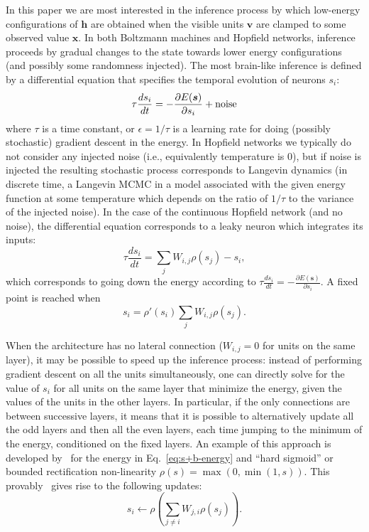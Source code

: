 \documentclass{article}
\newcommand   \vv{{\bm v}}
\newcommand   \vx{{\bm x}}
\newcommand   \vh{{\bm h}}
\newcommand   \vs{{\bm s}}
\begin{document}
In this paper we are most interested in the inference process by which low-energy
configurations of $\vh$ are obtained when the visible units $\vv$ are clamped
to some observed value $\vx$. In both Boltzmann machines and Hopfield networks,
inference proceeds by gradual changes to the state towards lower energy
configurations (and possibly some randomness injected). The most brain-like
inference is defined by a differential equation that specifies the temporal
evolution of neurons $s_i$:
\begin{equation}
  \label{eq:dsdt}
  \tau \frac{ds_i}{dt} = - \frac{\partial E(\vs)}{\partial s_i} + {\rm noise}
\end{equation}
where $\tau$ is a time constant, or $\epsilon=1/\tau$ is a learning rate for doing
(possibly stochastic) gradient descent in the energy. In Hopfield networks we
typically do not consider any injected noise (i.e., equivalently temperature is 0), but if noise is injected the resulting
stochastic process corresponds to Langevin dynamics (in discrete time, a Langevin
MCMC in a model associated with the given energy function at some temperature which
depends on the ratio of $1/\tau$ to the variance of the injected noise).
In the case of the continuous Hopfield network (and no noise), the differential equation corresponds
to a leaky neuron which integrates its inputs:
\begin{equation}
  \tau \frac{ds_i}{dt} = \sum_j W_{i,j} \rho(s_j) - s_i,
\end{equation}
which corresponds to going down the energy according to
$\tau \frac{ds_i}{dt} = - \frac{\partial E(\vs)}{\partial s_i}$. A fixed
point is reached when
\begin{equation}
   s_i = \rho'(s_i) \sum_j W_{i,j} \rho(s_j).
\end{equation}

When the architecture has no lateral connection ($W_{i,j}=0$ for units on the same layer),
it may be possible to speed up the inference process: instead of performing
gradient descent on all the units simultaneously, one can directly solve
for the value of $s_i$ for all units on the same layer that minimize the
energy, given the values of the units in the other layers. In particular,
if the only connections are between successive layers, it means that it is
possible to alternatively update all the odd layers and then all the even
layers, each time jumping to the minimum of the energy, conditioned on
the fixed layers. An example of this approach is developed by~\citet{Scellier+Bengio-arxiv2016}
for the energy in Eq.~\ref{eq:s+b-energy} and ``hard sigmoid''
or bounded rectification non-linearity $\rho(s)=\max(0,\min(1,s))$.
This provably~\citep{Scellier+Bengio-arxiv2016} gives rise to the following updates:
\begin{equation}
  \label{eq:direct}
   s_i \leftarrow \rho(\sum_{j\neq i} W_{j,i} \rho(s_j)). %
\end{equation}
\end{document}
